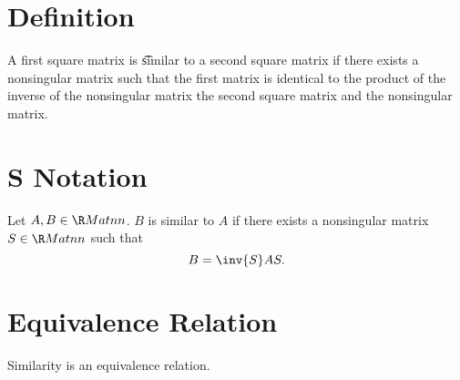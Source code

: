 
\section*{Definition}

A first square matrix is \t{similar} to a second square matrix if there exists a nonsingular matrix such that the first matrix is identical to the product of the inverse of the nonsingular matrix the second square matrix and the nonsingular matrix.

\section*{S Notation}

Let $A, B \in \R Mat{n}{n}$.
$B$ is similar to $A$ if there exists a nonsingular matrix $S \in \R Mat{n}{n}$ such that
  \[
B = \inv{S}AS.
  \]

\section*{Equivalence Relation}

\begin{prop}
Similarity is an equivalence relation.
\end{prop}

\blankpage